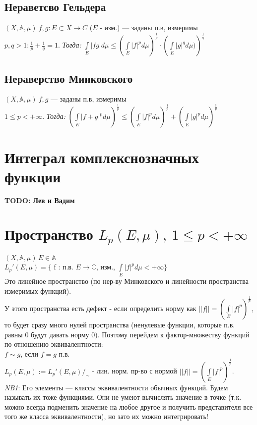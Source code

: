 \documentclass[paper=a4, fontsize=17pt]{article}
\begin{document}
	\subsection{Нераветсво Гельдера}
	$(X, \mathds{A}, \mu)\ f, g : E \subset X \rightarrow C$ ($E$ - изм.) --- заданы п.в, измеримы\\
	$p, q > 1 : \frac{1}{p} + \frac{1}{q} = 1$. 
	\emph{Тогда:}
	${\displaystyle \int\limits_E |fg|d\mu \leq \left(\int\limits_E |f|^p d\mu\right)^\frac{1}{p} \cdot \left(\int\limits_E |g|^q d\mu)\right)^\frac{1}{q}}$
	\subsection{Нераверство Минковского}
	$(X, \mathds{A}, \mu)\ f, g $ --- заданы п.в, измеримы\\
	$1 \leq p < +\infty$. 
	\emph{Тогда:}
	${\displaystyle \left(\int\limits_E |f + g|^p d\mu \right)^\frac{1}{p} 
		\leq \left(\int\limits_E |f|^p d\mu\right)^\frac{1}{p} 
		+ \left(\int\limits_E |g|^p d\mu\right)^\frac{1}{p}}$
	
	\section{Интеграл комплекснозначных функции}
	\textbf{TODO: Лев и Вадим}
	
	\section{Пространство $L_p(E,\mu),\ 1 \leq p < +\infty$}
	$(X, \mathds{A}, \mu)\, E \in \mathds{A}$\\
	$L_p'(E, \mu) = \{$ f : п.в. $E \rightarrow \mathbb{C}$, изм., $ \int\limits_E |f|^p d\mu < +\infty \}$\\
	Это линейное пространство (по нер-ву Минковского и линейности пространства измеримых функций).\\
	У этого пространства есть дефект - если определить норму как $||f|| = \left(\int\limits_E |f|^p\right)^\frac{1}{p}$, то будет сразу много нулей пространства (ненулевые функции, которые п.в. равны 0 будут давать норму 0).
	Поэтому перейдем к фактор-множеству функций по отношению эквивалентности:\\
	$f \sim g$, если $f = g$ п.в.\\
	$ L_p(E, \mu) := L_p'(E, \mu) /_{\sim}$ - лин. норм. пр-во с нормой $||f|| = \left(\int\limits_E |f|^p\right)^\frac{1}{p}$.\\
	
	\emph{NB1}: Его элементы --- классы эквивалентности обычных функций. Будем называть их тоже функциями. Они не умеют вычислять значение в точке (т.к. можно всегда подменить значение на любое другое и получить представителя все того же класса эквивалентности), но зато их можно интегрировать!\\
	
\end{document}
